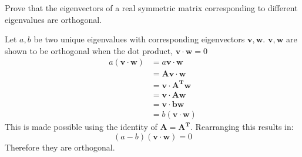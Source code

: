 Prove that the eigenvectors of a real symmetric matrix corresponding to different eigenvalues are orthogonal.

Let $a,b$ be two unique eigenvalues with corresponding eigenvectors $\boldsymbol{v},\boldsymbol{w}$. $\boldsymbol{v}, \boldsymbol{w}$ are shown to be orthogonal when the dot product, $\boldsymbol{v}\cdot \boldsymbol{w}=0$
\begin{equation*}
	\begin{split}
		a\left(\boldsymbol{v}\cdot \boldsymbol{w}\right)&=a\boldsymbol{v}\cdot \boldsymbol{w} \\
		&=\boldsymbol{A}\boldsymbol{v} \cdot \boldsymbol{w}\\
		&=\boldsymbol{v}\cdot \boldsymbol{A^{T}}\boldsymbol{w}\\
		&=\boldsymbol{v}\cdot \boldsymbol{A}\boldsymbol{w}\\
		&=\boldsymbol{v}\cdot \boldsymbol{b}\boldsymbol{w}\\
		&=b\left(\boldsymbol{v}\cdot \boldsymbol{w}\right)
	\end{split}
\end{equation*}
This is made possible using the identity of $\boldsymbol{A}=\boldsymbol{A^T}$.
Rearranging this results in:
\begin{equation*}
	\left(a-b\right)\left(\boldsymbol{v}\cdot\boldsymbol{w}\right)=0
\end{equation*}
Therefore they are orthogonal.